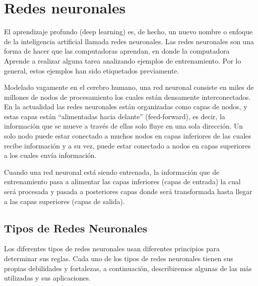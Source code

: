 \documentclass[12pt, a4paper, titlepage]{report}
\begin{document}
	    \section{Redes neuronales}
	    El aprendizaje profundo (deep learning) es, de hecho, un nuevo nombre o enfoque de la inteligencia artificial llamada redes neuronales. Las redes neuronales son una forma de hacer que las computadoras aprendan, en donde la computadora \Gls{Aprende} a realizar alguna tarea analizando ejemplos de entrenamiento. Por lo general, estos ejemplos han sido etiquetados previamente.\par
		Modelado vagamente en el cerebro humano, una red neuronal consiste en miles de millones de nodos de procesamiento los cuales están densamente interconectados. En la actualidad las redes neuronales están organizadas como capas de nodos, y estas capas están “alimentadas hacia delante” (feed-forward), es decir, la información que se mueve a través de ellas solo fluye en una sola dirección. Un solo nodo puede estar conectado a muchos nodos en capas inferiores de las cuales recibe información y a su vez, puede estar conectado a nodos en capas superiores a los cuales envía información.\par
		Cuando una red neuronal está siendo entrenada, la información que de entrenamiento pasa a alimentar las capas inferiores (capas de entrada) la cual será procesada y pasada a posteriores capas donde será transformada hasta llegar a las capas superiores (capas de salida).\cite{refQueSonRedesNeu}
        	\subsection{Tipos de Redes Neuronales}
        	    Los diferentes tipos de redes neuronales usan diferentes principios para determinar sus reglas. Cada uno de los tipos de redes neuronales tienen sus propias debilidades y fortalezas, a continuación, describiremos algunas de las más utilizadas y sus aplicaciones.
\end{document}
